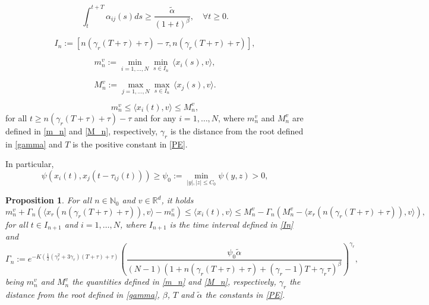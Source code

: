 \documentclass[10pt,a4paper]{amsart}
\newtheorem{prop}{Proposition}
\begin{document}
	\begin{equation}\label{PE}
		\int_{t}^{t+T}\alpha_{ij}(s)ds\geq \frac{\tilde{\alpha}}{(1+t)^\beta},\quad \forall t\geq 0.
	\end{equation}

		\begin{equation}\label{In}
			I_n:=[n(\gamma_r (T+\tau)+\tau)-\tau,n(\gamma_r (T+\tau)+\tau)],
		\end{equation}

		\begin{equation}\label{m_n}
			m_n^v:=\min_{i=1,\dots,N}\min_{s\in I_n}\,\langle x_{i}(s),v\rangle,
		\end{equation}

		\begin{equation}\label{M_n}
			M_n^v:=\max_{j=1,\dots,N}\max_{s\in I_n}\,\langle x_{j}(s),v\rangle.
		\end{equation}

		\begin{equation}\label{scalpronoff}
			m_n^v\leq \langle x_{i}(t),v\rangle \leq M_n^v,
		\end{equation}for all  $t\geq n(\gamma_r(T+\tau)+\tau)-\tau$ and for any $i=1,\dots,N$, where $m_n^v$ and $M_n^v$ are defined in \eqref{m_n} and \eqref{M_n}, respectively, $\gamma_r$ is the distance from the root defined in \eqref{gamma} and $T$ is the positive constant in \eqref{PE}.

        In particular,        \begin{equation}\label{stima_psionoff}
			\psi (x_i(t), x_j(t-\tau_{ij}(t)))\ge \psi_{0}:=\min_{\vert y\vert, \vert z\vert \le  C_{0}}\psi(y,z)>0,
		\end{equation}

	\begin{prop}\label{lemma3onoff}
		For all $n\in \mathbb{N}_0$ and $v\in \mathbb{R}^d$, it holds
		\begin{equation} \label{Bonoff}
			m_{n}^v+\Gamma_n(\langle x_r(n(\gamma_r(T+\tau)+\tau)),v \rangle-m^v_{n}) \leq \langle x_i(t),v\rangle\leq M^v_{n}-\Gamma_n(M^v_{n}-\langle x_r(n(\gamma_r(T+\tau)+\tau)),v \rangle), 
		\end{equation}
		for all $t\in I_{n+1}$ and $i =1,\dots, N$, where $I_{n+1}$ is the time interval defined in \eqref{In} and		\begin{equation}\label{Gammaonoff}
			\Gamma_n:=e^{-K (\frac{1}{2}(\gamma_{r}^2+3\gamma_r)(T+\tau)+\tau)}\left(\frac{\psi_{0}\tilde{\alpha}}{(N-1)(1+n(\gamma_r(T+\tau)+\tau)+(\gamma_r-1)T+\gamma_r\tau)^\beta}\right)^{\gamma_r},
		\end{equation}
		being $m_n^v$ and $M_n^v$ the quantities defined in \eqref{m_n} and \eqref{M_n}, respectively, $\gamma_r$ the distance from the root defined in \eqref{gamma}, $\beta$, $T$ and $\tilde{\alpha}$ the constants in \eqref{PE}.
	\end{prop}
\end{document}
